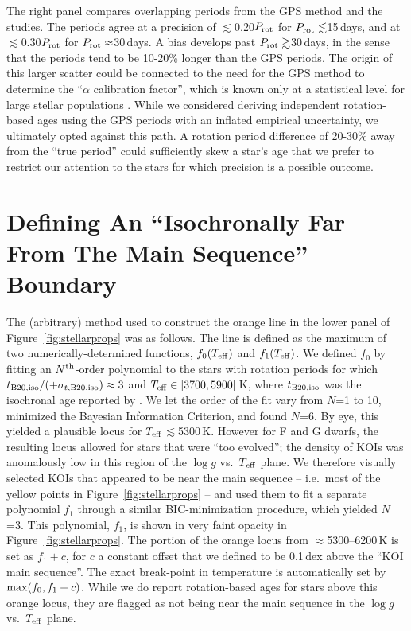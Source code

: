 \documentclass[11pt,twocolumn,tighten]{aastex63}
\begin{document}
The right panel compares overlapping periods from the
\citet{Reinhold2023} GPS method and the \citeauthor{Santos_2021} studies.  The
periods agree at a precision of $\lesssim$0.20$P_{\rm rot}$ for
$P_{\rm rot}\lesssim$15\,days, and at $\lesssim$0.30$P_{\rm rot}$ for
$P_{\rm rot}\approx$30\,days.  A  bias develops past $P_{\rm
rot}\gtrsim$30\,days, in the sense that the \citeauthor{Santos_2021}
periods tend to be 10-20\% longer than the GPS periods.  The origin of
this larger scatter could be connected to the need for the GPS method
to determine the ``$\alpha$ calibration factor'', which is known only
at a statistical level for large stellar populations
\citep[see][]{Reinhold2023}.  While we considered deriving independent
rotation-based ages using the \citet{Reinhold2023} GPS periods with an
inflated empirical uncertainty, we ultimately opted against this path.
A rotation period difference of 20-30\% away from the ``true period''
could sufficiently skew a star's age that we prefer to restrict our
attention to the stars for which precision is a possible
outcome.





\section{Defining An ``Isochronally Far From The Main Sequence'' Boundary}
\label{app:linemethod}

The (arbitrary) method used to construct the orange line in 
the lower panel of Figure~\ref{fig:stellarprops} was as follows.
The line is	defined as
the maximum of two numerically-determined functions, $f_0(T_{\rm eff})$ and $f_1(T_{\rm eff})$.
We defined $f_0$ by fitting an
$N^{\rm th}$-order polynomial to the stars with rotation periods for which $t_{\rm
	B20,iso}/(+\sigma_{t,{\rm B20,iso}})\approx 3$
and $T_{\rm eff}\in[3700,5900]$\,K, where
$t_{\rm B20,iso}$ was the isochronal age reported by
\citet{Berger_2020a_catalog}.  We let the order of the fit vary from
$N$=1 to 10, minimized the Bayesian Information Criterion,
and found $N$=6.  
By eye, this yielded a plausible locus for $T_{\rm eff}$$\lesssim$5300\,K.
However for F and G dwarfs, the resulting locus
allowed for stars that were ``too evolved''; the density of KOIs 
was anomalously low in this region of the $\log g$ vs.\ $T$$_{\rm eff}$ plane.
We therefore visually selected KOIs that appeared
to be near the main sequence -- i.e.~most of the yellow
points in Figure~\ref{fig:stellarprops} -- and used them to fit a separate
polynomial $f_1$ through a similar BIC-minimization procedure,
which yielded $N$=3.
This polynomial, $f_1$, is shown in very faint opacity in Figure~\ref{fig:stellarprops}.
The portion of the orange locus from $\approx$5300--6200\,K
is set as $f_1 + c$, for $c$ a constant offset that we defined to be
0.1\,dex above the ``KOI main sequence''.
The exact break-point in temperature is automatically set by ${\rm max}(f_0, f_1+c)$.
While we do report rotation-based ages for stars
above this orange locus,
they are flagged as not being near the main sequence in the $\log g$ vs.~$T_{\rm eff}$ plane. 
\end{document}
